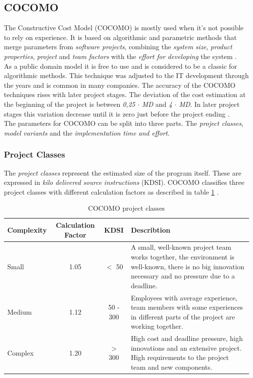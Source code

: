 \subsection{COCOMO} \label{COCOMOMethod}

The Constructive Cost Model (COCOMO) is mostly used when it's not possible to rely on experience. It is based on algorithmic and parametric methods that merge parameters from \textit{software projects}, combining the \textit{system size}, \textit{product properties}, \textit{project} and \textit{team factors} with the \textit{effort for developing} the system \cite{jenny}.\\
As a public domain model it is free to use and is considered to be a classic for algorithmic methods. This technique was adjusted to the IT development through the years and is common in many companies.
The accuracy of the COCOMO techniques rises with later project stages. The deviation of the cost estimation at the beginning of the project is between \textit{0,25 $\cdot$ MD} and \textit{4 $\cdot$ MD}. In later project stages this variation decrease until it is zero just before the project ending \cite{sommerville}.\\
The parameters for COCOMO can be split into three parts. The \textit{project classes}, \textit{model variants} and the \textit{implementation time and effort}.

\subsubsection{Project Classes}

The \textit{project classes} represent the estimated size of the program itself. These are expressed in \textit{kilo delivered source instructions} (KDSI). COCOMO classifies three project classes with different calculation factors as described in table \ref{tab:projectclasses} \cite{sommerville}.

\begin{table}[h]
	\centering 
	\setlength{\tabcolsep}{4pt}
	\begin{tabular}{|l|c|c|p{6cm}|}\hline
		Complexity	& Calculation Factor& KDSI 	& Describtion\\ \hline
		Small   	& 1.05        		& $<$ 50  			& A small, well-known project team works together, the environment is well-known, there is no big innovation necessary and no pressure due to a deadline.\\ \hline
		Medium 		& 1.12        		& 50 - 300 			& Employees with average experience, team members with some experiences in different parts of the project are working together.  \\ \hline
		Complex 	& 1.20 				& $>$ 300 			& High cost and deadline pressure, high innovations and an extensive project. High requirements to the project team and new components.  \\ \hline
	\end{tabular} 
	\caption{COCOMO project classes} 
	\label{tab:projectclasses} 
\end{table}


